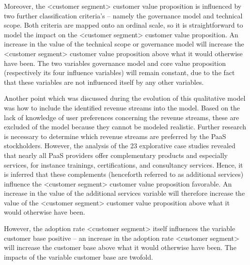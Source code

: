 Moreover, the <customer segment> customer value proposition is influenced by two further classification criteria's -- namely the governance model and technical scope. Both criteria are mapped onto an ordinal scale, so it is straightforward to model the impact on the <customer segment> customer value proposition. An increase in the value of the technical scope or governance model will increase the <customer segment> customer value proposition above what it would otherwise have been. The two variables governance model and core value proposition (respectively its four influence variables) will remain constant, due to the fact that these variables are not influenced itself by any other variables.

Another point which was discussed during the 	evolution of this qualitative model was how to include the identified revenue streams into the model. Based on the lack of knowledge of user preferences concerning the revenue streams, these are excluded of the model because they cannot be modeled realistic. Further research is necessary to determine which revenue streams are preferred by the \ac{PaaS} stockholders. However, the analysis of the 23 explorative case studies revealed that nearly all \ac{PaaS} providers offer complementary products and especially services, for instance trainings, certifications, and consultancy services. Hence, it is inferred that these complements (henceforth referred to as additional services) influence the <customer segment> customer value proposition favorable. An increase in the value of the additional services variable will therefore increase the value of the <customer segment> customer value proposition above what it would otherwise have been.

However, the adoption rate <customer segment> itself influences the variable customer base positive -- an increase in the adoption rate <customer segment> will increase the customer base above what it would otherwise have been. The impacts of the variable customer base are twofold. 

